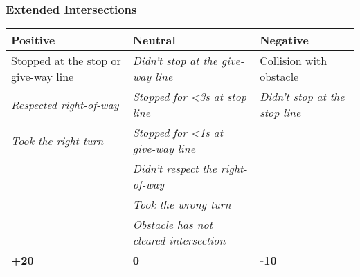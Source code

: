 {\subsubsection*{Extended Intersections}
\begin{table}[H]
    \begin{tabularx}{\textwidth}{@{}XXX@{}}
        \toprule
        \textbf{Positive}                               & \textbf{Neutral}                                               & \textbf{Negative}                                     \\
        \midrule
        Stopped at the stop or give-way line            & \textit{Didn't stop at the give-way line}\footnotemark[3]      & Collision with obstacle                               \\
        \textit{Respected right-of-way}\footnotemark[2] & \textit{Stopped for <3s at stop line}\footnotemark[1]          & \textit{Didn't stop at the stop line}\footnotemark[1] \\
        \textit{Took the right turn}\footnotemark[4]    & \textit{Stopped for <1s at give-way line}\footnotemark[3]      &                                                       \\
                                                        & \textit{Didn't respect the right-of-way}\footnotemark[2]       &                                                       \\
                                                        & \textit{Took the wrong turn}\footnotemark[4]                   &                                                       \\
                                                        & \textit{Obstacle has not cleared intersection}\footnotemark[2] &                                                       \\
        \textbf{+20}                                    & \textbf{0}                                                     & \textbf{-10}                                          \\
        \bottomrule
    \end{tabularx}
\end{table}


}
